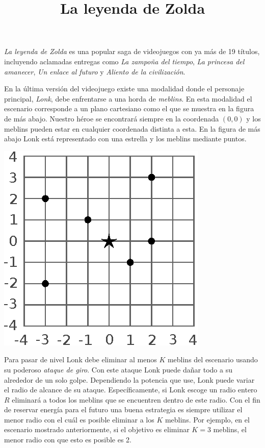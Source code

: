 \documentclass{oci}
\title{La leyenda de Zolda}
\begin{document}
\begin{problemDescription}
  \emph{La leyenda de Zolda} es una popular saga de videojuegos con ya más de 19
  títulos, incluyendo aclamadas entregas como \emph{La zampoña del tiempo},
  \emph{La princesa del amanecer}, \emph{Un enlace al futuro} y \emph{Aliento de
  la civilización}.

  En la última versión del videojuego existe una modalidad donde el personaje
  principal, \emph{Lonk}, debe enfrentarse a una horda de \emph{meblins}.
  En esta modalidad el escenario corresponde a un plano cartesiano como el que
  se muestra en la figura de más abajo.
  Nuestro héroe se encontrará siempre en la coordenada $(0,0)$ y los meblins
  pueden estar en cualquier coordenada distinta a esta.
  En la figura de más abajo Lonk está representado con una estrella y los meblins
  mediante puntos.
  \vspace{-0.5em}
  \begin{center}
  \includegraphics[scale=0.9]{zolda}
  \end{center}
  \vspace{-0.5em}
  Para pasar de nivel Lonk debe eliminar al menos $K$ meblins del escenario
  usando su poderoso \emph{ataque de giro}.
  Con este ataque Lonk puede dañar todo a su alrededor de un solo golpe.
  Dependiendo la potencia que use, Lonk puede variar el radio de alcance de su
  ataque.
  Específicamente, si Lonk escoge un radio entero $R$ eliminará a todos los
  meblins que se encuentren dentro de este radio.
  Con el fin de reservar energía para el futuro una buena estrategia es siempre
  utilizar el menor radio con el cuál es posible eliminar a los $K$ meblins.
  Por ejemplo, en el escenario mostrado anteriormente, si el objetivo es eliminar
  $K=3$ meblins, el menor radio con que esto es posible es 2.


\end{problemDescription}
\end{document}

